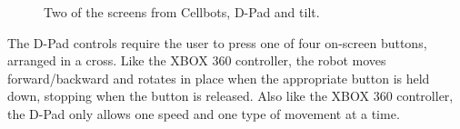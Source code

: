 \documentclass[12pt, letterpaper]{report}
\begin{document}
\begin{figure}
	\caption{Two of the screens from Cellbots, D-Pad and tilt.}
	\label{cellbots}
\end{figure}

The D-Pad controls require the user to press one of four on-screen buttons, arranged in a cross. Like the XBOX 360 controller, the robot moves forward/backward and rotates in place when the appropriate button is held down, stopping when the button is released. Also like the XBOX 360 controller, the D-Pad only allows one speed and one type of movement at a time.
\end{document}
